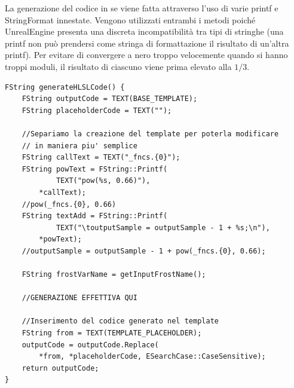 \documentclass[main.tex]{subfiles}
\begin{document}
La generazione del codice in se viene fatta attraverso l'uso di varie printf e StringFormat innestate. Vengono utilizzati entrambi i metodi poiché UnrealEngine presenta una discreta incompatibilità tra tipi di stringhe (una printf non può prendersi come stringa di formattazione il risultato di un'altra printf). Per evitare di convergere a nero troppo velocemente quando si hanno troppi moduli, il risultato di ciascuno viene prima elevato alla $1/3$.
\lstset{language=UEcpp}
\begin{lstlisting}
FString generateHLSLCode() {
    FString outputCode = TEXT(BASE_TEMPLATE);
    FString placeholderCode = TEXT("");

    //Separiamo la creazione del template per poterla modificare
    // in maniera piu' semplice
    FString callText = TEXT("_fncs.{0}");
    FString powText = FString::Printf(
            TEXT("pow(%s, 0.66)"),
        *callText);
    //pow(_fncs.{0}, 0.66)
    FString textAdd = FString::Printf(
            TEXT("\toutputSample = outputSample - 1 + %s;\n"),
        *powText);
    //outputSample = outputSample - 1 + pow(_fncs.{0}, 0.66);
    
    FString frostVarName = getInputFrostName();

    //GENERAZIONE EFFETTIVA QUI

    //Inserimento del codice generato nel template
    FString from = TEXT(TEMPLATE_PLACEHOLDER);
	outputCode = outputCode.Replace(
        *from, *placeholderCode, ESearchCase::CaseSensitive);
	return outputCode;
}
\end{lstlisting}
\end{document}

